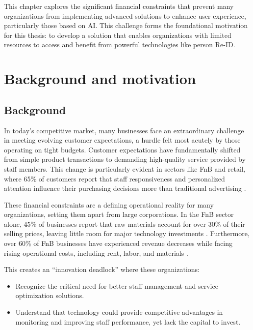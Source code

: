 \documentclass[../main.tex]{subfiles}
\begin{document}
This chapter explores the significant financial constraints that prevent many organizations from implementing advanced solutions to enhance user experience, particularly those based on AI. This challenge forms the foundational motivation for this thesis: to develop a solution that enables organizations with limited resources to access and benefit from powerful technologies like person Re-ID.

\section{Background and motivation}
\label{sec:background}

\subsection{Background}

In today's competitive market, many businesses face an extraordinary challenge in meeting evolving customer expectations, a hurdle felt most acutely by those operating on tight budgets. Customer expectations have fundamentally shifted from simple product transactions to demanding high-quality service provided by staff members. This change is particularly evident in sectors like \gls{FnB} and retail, where 65\% of customers report that staff responsiveness and personalized attention influence their purchasing decisions more than traditional advertising \cite{customer_experience}.

These financial constraints are a defining operational reality for many organizations, setting them apart from large corporations. In the FnB sector alone, 45\% of businesses report that raw materials account for over 30\% of their selling prices, leaving little room for major technology investments \cite{customer_experience2}. Furthermore, over 60\% of FnB businesses have experienced revenue decreases while facing rising operational costs, including rent, labor, and materials \cite{customer_experience3}.

This creates an ``innovation deadlock'' where these organizations:
\begin{itemize}
    \item Recognize the critical need for better staff management and service optimization solutions.
    \item Understand that technology could provide competitive advantages in monitoring and improving staff performance, yet lack the capital to invest.
\end{itemize}
\end{document}
